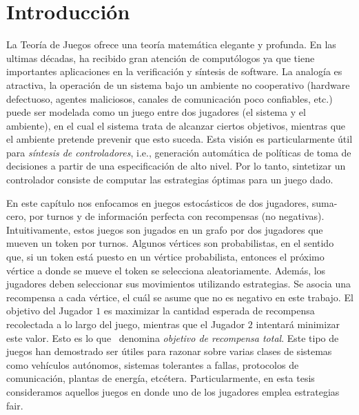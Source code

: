 \section{Introducción} \label{sec:intro_fair}
La Teoría de Juegos \cite{MorgensternNeuman42}  ofrece una teoría matemática elegante y profunda. 
En las ultimas décadas, ha recibido gran atención de computólogos ya que tiene importantes aplicaciones en la verificación y síntesis de software. 
La analogía es atractiva, la operación de un sistema bajo un ambiente no cooperativo (hardware defectuoso, agentes maliciosos, canales de comunicación poco confiables, etc.) puede ser modelada como un juego entre dos jugadores (el sistema y el ambiente), en el cual el sistema trata de alcanzar ciertos objetivos, mientras que el ambiente pretende prevenir que esto suceda. 
Esta visión es particularmente útil para \emph{síntesis de controladores}, i.e., generación automática de políticas de toma de decisiones a partir de una especificación de alto nivel. 
Por lo tanto, sintetizar un controlador consiste de computar las estrategias óptimas para un juego dado.
		
En este capítulo nos enfocamos en juegos estocásticos de dos jugadores, suma-cero, por turnos y de información perfecta con recompensas (no negativas)\cite{FilarV96}. 
Intuitivamente, estos juegos son jugados en un grafo por dos jugadores que mueven un token por turnos. Algunos vértices son probabilistas, en el sentido que, si un token está puesto en un vértice probabilista, entonces el próximo vértice a donde se mueve el token se selecciona aleatoriamente. Además, los jugadores deben seleccionar sus movimientos utilizando estrategias. Se asocia una recompensa a cada vértice, el cuál se asume que no es negativo en este trabajo. El objetivo del Jugador $1$ es maximizar la cantidad esperada de recompensa recolectada a lo largo del juego, mientras que el Jugador $2$ intentará minimizar este valor. Esto es lo que~\cite{SvorenovaKwiatkowska16} denomina \emph{objetivo de recompensa total}.
Este tipo de juegos han demostrado ser útiles para razonar sobre varias clases de sistemas como vehículos autónomos, sistemas tolerantes a fallas, protocolos de comunicación, plantas de energía, etcétera.  %
Particularmente, en esta tesis consideramos aquellos juegos en donde uno de los jugadores emplea estrategias fair.

